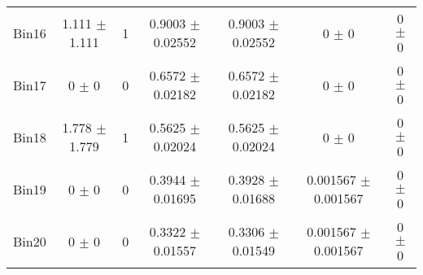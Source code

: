 \begin{tabular}{@{\extracolsep{4pt}}lcccccc@{}}
     Bin16 & 1.111 $\pm$ 1.111 & 1 & 0.9003 $\pm$ 0.02552 & 0.9003 $\pm$ 0.02552 & 0 $\pm$ 0 & 0 $\pm$ 0 \\ 
     Bin17 & 0 $\pm$ 0 & 0 & 0.6572 $\pm$ 0.02182 & 0.6572 $\pm$ 0.02182 & 0 $\pm$ 0 & 0 $\pm$ 0 \\ 
     Bin18 & 1.778 $\pm$ 1.779 & 1 & 0.5625 $\pm$ 0.02024 & 0.5625 $\pm$ 0.02024 & 0 $\pm$ 0 & 0 $\pm$ 0 \\ 
     Bin19 & 0 $\pm$ 0 & 0 & 0.3944 $\pm$ 0.01695 & 0.3928 $\pm$ 0.01688 & 0.001567 $\pm$ 0.001567 & 0 $\pm$ 0 \\ 
     Bin20 & 0 $\pm$ 0 & 0 & 0.3322 $\pm$ 0.01557 & 0.3306 $\pm$ 0.01549 & 0.001567 $\pm$ 0.001567 & 0 $\pm$ 0 \\ 
\hline\hline
  \end{tabular}
